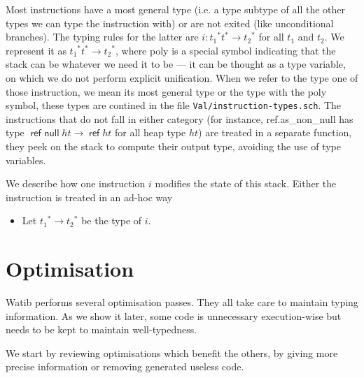 \documentclass[a4paper,11pt]{article}
\DeclareMathOperator{\reft}{\textsf{ref}}
\DeclareMathOperator{\refnullt}{\textsf{ref null}}
\begin{document}
Most instructions have a most general type (i.e. a type subtype of all the other
types we can type the instruction with) or are not exited (like unconditional
branches). The typing rules for the latter are $i:{t_1}^*t^*\to {t_2}^*$ for all
$t_1$ and $t_2$. We represent it as ${t_1}^*t^*\to {t_2}^*$, where \textsf{poly}
is a special symbol indicating that the stack can be whatever we need it to be
--- it can be thought as a type variable, on which we do not perform explicit
unification. When we refer to the type one of those instruction, we mean its
most general type or the type with the \textsf{poly} symbol, these types are
contined in the file \texttt{Val/instruction-types.sch}. The instructions that
do not fall in either category (for instance, \textsf{ref.as\_non\_null} has
type $\refnullt ht\to \reft ht$ for all heap type $ht$) are treated in a
separate function, they peek on the stack to compute their output type, avoiding
the use of type variables.

We describe how one instruction $i$ modifies the state of this stack. Either the
instruction is treated in an ad-hoc way

\begin{itemize}
\item Let ${t_1}^*\to{t_2}^*$ be the type of $i$.
\end{itemize}
\section{Optimisation}\label{opt}
\textsf{Watib} performs several optimisation passes. They all take care to
maintain typing information. As we show it later, some code is unnecessary
execution-wise but needs to be kept to maintain well-typedness.

We start by reviewing optimisations which benefit the others, by giving more
precise information or removing generated useless code.
\end{document}
